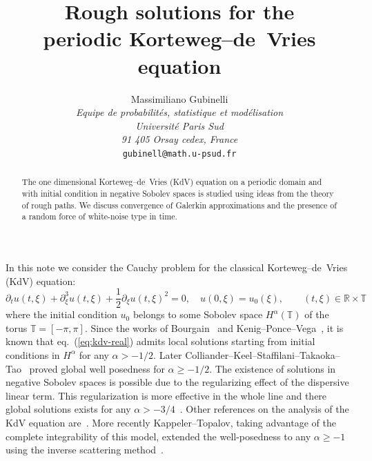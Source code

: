 \documentclass[a4paper,11pt,reqno]{article}
\newcommand{\RR}{\mathbb{R}}
\newcommand{\TT}{\mathbb{T}}
\begin{document}
\title{Rough solutions for the\\ periodic Korteweg--de~Vries equation}
\author{
  { Massimiliano Gubinelli}              \\
{\small\it Equipe de probabilit\'es, statistique et mod\'elisation }\\[-0.1cm]
  {\small\it  Universit\'e Paris Sud}          \\[-0.1cm]
{\small \it 91 405 Orsay cedex, France}\\[-0.1cm] 
 {\small  {\tt gubinell@math.u-psud.fr}}   
}
\maketitle


\begin{abstract}
The one dimensional Korteweg--de~Vries (KdV) equation on a periodic
domain and with initial condition in negative Sobolev spaces is studied using ideas from the theory of rough paths. We discuss convergence of Galerkin approximations and the presence of a random force of white-noise type in time.  
\end{abstract}

In this note we consider the Cauchy problem for the
 classical   Korteweg--de~Vries (KdV) equation:
\begin{equation}
  \label{eq:kdv-real}
\partial_t u(t,\xi) + \partial^3_\xi u(t,\xi) +
\frac12 \partial_\xi u(t,\xi)^2 = 0,\quad u(0,\xi) = u_0(\xi), \qquad
(t,\xi)\in\RR\times \TT  
\end{equation}
where  the initial condition $u_0$ belongs to some Sobolev space $H^\alpha(\TT)$
of the torus $\TT = [-\pi,\pi]$. Since the works of Bourgain~\cite{MR1215780,MR1423623} and
Kenig--Ponce--Vega~\cite{MR1329387,MR1230283,MR1086966}, it is known that eq.~(\ref{eq:kdv-real})  admits local
solutions starting from initial conditions in $H^\alpha$ for any
$\alpha >-1/2$.  Later Colliander--Keel--Staffilani--Takaoka--Tao~\cite{MR1969209} proved global well posedness for $\alpha \ge -1/2$. The existence of solutions in negative Sobolev spaces is possible due to the
regularizing effect of the dispersive linear term. This regularization
is more effective in the whole line and there global solutions exists for any $\alpha > -3/4$~\cite{MR1230283,MR1969209}. Other references on the analysis of the KdV equation are~\cite{MR1019307,MR759907}.
More recently  Kappeler--Topalov, taking advantage of the complete integrability of this model, extended the well-posedness to any $\alpha \ge -1$ using the inverse scattering method~\cite{MR2181576}.  
\end{document}
